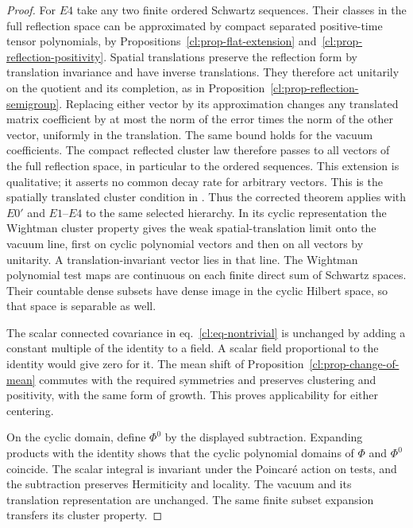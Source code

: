 \documentclass[11pt,letterpaper,reqno]{amsart}
\numberwithin{equation}{section}
\renewcommand{\eqref}[1]{\textup{eq.~\ref{#1}}}
\theoremstyle{definition}
\theoremstyle{remark}
\begin{document}
\begin{proof}
For \(E4\) take any two finite ordered Schwartz sequences.
Their classes in the full reflection space can be approximated
by compact separated positive-time tensor polynomials, by
Propositions~\ref{cl:prop-flat-extension}
and~\ref{cl:prop-reflection-positivity}.
Spatial translations preserve the reflection form by
translation invariance and have inverse translations.
They therefore act unitarily on the quotient and its
completion, as in Proposition~\ref{cl:prop-reflection-semigroup}. Replacing
either vector by its approximation changes any translated
matrix coefficient by at most the norm of the error times
the norm of the other vector, uniformly in the translation.
The same bound holds for the vacuum coefficients.
The compact reflected cluster law therefore passes to all
vectors of the full reflection space, in particular to the
ordered sequences. This extension is qualitative; it asserts
no common decay rate for arbitrary vectors. This is the spatially translated
cluster condition in \cite[Section 3, p.~88]{OS73}.
Thus the corrected theorem applies with \(E0'\) and
\(E1\)--\(E4\) to the same selected hierarchy.
In its cyclic representation the Wightman cluster
property gives the weak spatial-translation limit onto
the vacuum line, first on cyclic polynomial vectors and
then on all vectors by unitarity. A translation-invariant
vector lies in that line. The Wightman polynomial test maps
are continuous on each finite direct sum of Schwartz spaces.
Their countable dense subsets have dense image in the cyclic
Hilbert space, so that space is separable as well.

The scalar connected covariance in
\eqref{cl:eq-nontrivial} is unchanged by adding a constant
multiple of the identity to a field. A scalar field
proportional to the identity would give zero for it.
The mean shift of Proposition~\ref{cl:prop-change-of-mean}
commutes with the required symmetries and preserves
clustering and positivity, with the same form of growth.
This proves applicability for either centering.

On the cyclic domain, define \(\Phi^0\) by the displayed subtraction.
Expanding products with the identity shows that the cyclic
polynomial domains of \(\Phi\) and \(\Phi^0\) coincide.
The scalar integral is invariant under the Poincar\'e action
on tests, and the subtraction preserves Hermiticity and locality.
The vacuum and its translation representation are unchanged.
The same finite subset expansion transfers its cluster property.


\end{proof}
\end{document}
